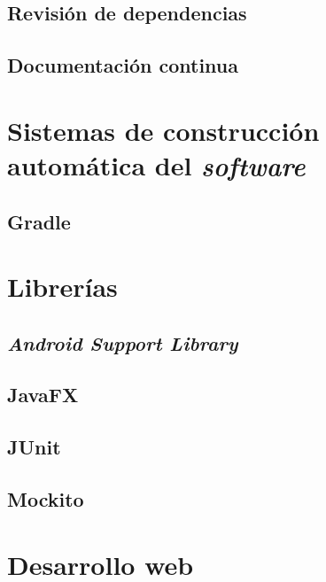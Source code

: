 \subsection{Revisión de dependencias}\label{revision-de-dependencias}



\subsection{Documentación continua}\label{documentacion-continua}



\section{Sistemas de construcción automática del
	\emph{software}}\label{sistemas-de-construccion-automuxe1tica-del-software}



\subsection{Gradle}\label{gradle}



\section{Librerías}\label{libreruxedas}

\subsection{\texorpdfstring{\emph{Android Support
			Library}}{Android Support Library}}\label{android-support-library}


\subsection{JavaFX}\label{javafx}



\subsection{JUnit}\label{junit}


\subsection{Mockito}\label{mockito}


\newpage
\section{Desarrollo web}\label{pagina-web}

